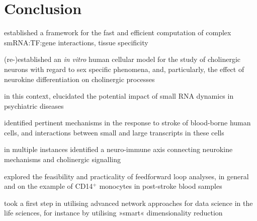 \chapter{Conclusion}
\label{conclusion}

established a framework for the fast and efficient computation of complex smRNA:TF:gene interactions, tissue specificity

(re-)established an \emph{in vitro} human cellular model for the study of cholinergic neurons with regard to sex specific phenomena, and, particularly, the effect of neurokine differentiation on cholinergic processes

in this context, elucidated the potential impact of small RNA dynamics in psychiatric diseases

identified pertinent mechanisms in the response to stroke of blood-borne human cells, and interactions between small and large transcripts in these cells

in multiple instances identified a neuro-immune axis connecting neurokine mechanisms and cholinergic signalling

explored the feasibility and practicality of feedforward loop analyses, in general and on the example of CD14$^+$ monocytes in post-stroke blood samples

took a first step in utilising advanced network approaches for data science in the life sciences, for instance by utilising »smart« dimensionality reduction

